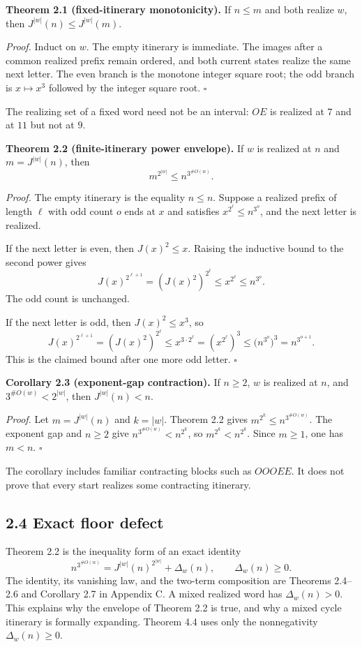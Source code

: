 \documentclass[12pt]{article}
\begin{document}
\textbf{Theorem 2.1 (fixed-itinerary monotonicity).} If \(n\le m\) and
both realize \(w\), then \(J^{|w|}(n)\le J^{|w|}(m)\).

\emph{Proof.} Induct on \(w\). The empty itinerary is immediate. The
images after a common realized prefix remain ordered, and both current
states realize the same next letter. The even branch is the monotone
integer square root; the odd branch is \(x\mapsto x^3\) followed by the
integer square root. \(\square\)

The realizing set of a fixed word need not be an interval: \(OE\) is
realized at \(7\) and at \(11\) but not at \(9\).

\textbf{Theorem 2.2 (finite-itinerary power envelope).} If \(w\) is
realized at \(n\) and \(m=J^{|w|}(n)\), then \[
m^{2^{|w|}}\le n^{3^{\#O(w)}}.
\]

\emph{Proof.} The empty itinerary is the equality \(n\le n\). Suppose a
realized prefix of length \(\ell\) with odd count \(o\) ends at \(x\)
and satisfies \(x^{2^\ell}\le n^{3^o}\), and the next letter is
realized.

If the next letter is even, then \(J(x)^2\le x\). Raising the inductive
bound to the second power gives \[
J(x)^{2^{\ell+1}}=(J(x)^2)^{2^\ell}\le x^{2^\ell}\le n^{3^o}.
\] The odd count is unchanged.

If the next letter is odd, then \(J(x)^2\le x^3\), so \[
J(x)^{2^{\ell+1}}=(J(x)^2)^{2^\ell}\le x^{3\cdot 2^\ell}
=(x^{2^\ell})^3\le\bigl(n^{3^o}\bigr)^3=n^{3^{o+1}}.
\] This is the claimed bound after one more odd letter. \(\square\)

\textbf{Corollary 2.3 (exponent-gap contraction).} If \(n\ge2\), \(w\)
is realized at \(n\), and \(3^{\#O(w)}<2^{|w|}\), then \(J^{|w|}(n)<n\).

\emph{Proof.} Let \(m=J^{|w|}(n)\) and \(k=|w|\). Theorem 2.2 gives
\(m^{2^k}\le n^{3^{\#O(w)}}\). The exponent gap and \(n\ge2\) give
\(n^{3^{\#O(w)}}<n^{2^k}\), so \(m^{2^k}<n^{2^k}\). Since \(m\ge1\), one
has \(m<n\). \(\square\)

The corollary includes familiar contracting blocks such as \(OOOEE\). It
does not prove that every start realizes some contracting itinerary.

\subsection{2.4 Exact floor defect}\label{exact-floor-defect}

Theorem 2.2 is the inequality form of an exact identity \[
n^{3^{\#O(w)}}=J^{|w|}(n)^{2^{|w|}}+\Delta_w(n),\qquad\Delta_w(n)\ge0.
\] The identity, its vanishing law, and the two-term composition are
Theorems 2.4--2.6 and Corollary 2.7 in Appendix C. A mixed realized word
has \(\Delta_w(n)>0\). This explains why the envelope of Theorem 2.2 is
true, and why a mixed cycle itinerary is formally expanding. Theorem 4.4
uses only the nonnegativity \(\Delta_w(n)\ge0\).
\end{document}
